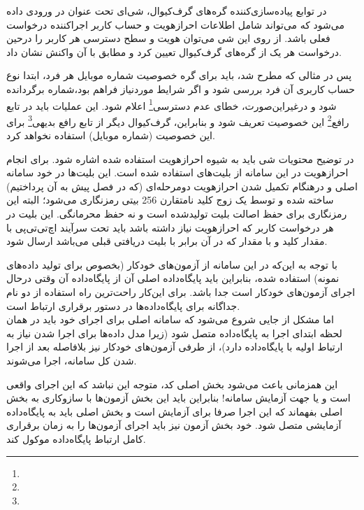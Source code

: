 در توابع پیاده‌سازی‌کننده گره‌های گرف‌کیوال، شی‌ای تحت عنوان  در ورودی داده می‌شود که می‌تواند شامل اطلاعات احرازهویت و حساب کاربر اجراکننده درخواست فعلی باشد. از روی این شی می‌توان هویت و سطح دسترسی هر کاربر را درحین درخواست هر یک از گره‌های گرف‌کیوال تعیین کرد و مطابق با آن واکنش نشان داد.

پس در مثالی که مطرح شد، باید برای گره خصوصیت شماره موبایل هر فرد، ابتدا نوع حساب کاربری آن فرد بررسی شود و اگر شرایط موردنیاز فراهم بود،‌شماره برگردانده شود و درغیراین‌صورت،‌ خطای عدم دسترسی\footnote{} اعلام شود. این عملیات باید در تابع رافع\footnote{} این خصوصیت تعریف شود و بنابراین، گرف‌کیوال دیگر از تابع رافع بدیهی\footnote{} برای این خصوصیت (شماره موبایل) استفاده نخواهد کرد.

در توضیح محتویات شی  باید به شیوه احرازهویت استفاده شده اشاره شود. برای انجام احرازهویت در این سامانه از بلیت‌های  استفاده شده است. این بلیت‌ها در خود سامانه اصلی و درهنگام تکمیل شدن احرازهویت دومرحله‌ای (که در فصل پیش به آن پرداختیم) ساخته شده و توسط یک زوج کلید نامتقارن 256 بیتی رمزنگاری می‌شود؛ البته این رمزنگاری برای حفظ اصالت بلیت تولیدشده است و نه حفظ محرمانگی. این بلیت در هر درخواست کاربر که احرازهویت نیاز داشته باشد باید تحت سرآیند اچ‌تی‌تی‌پی با مقدار کلید  و با مقدار  که در آن  برابر با بلیت دریافتی قبلی می‌باشد ارسال شود\cite{jwt}. 


با توجه به این‌که در این سامانه از آزمون‌های خودکار (بخصوص برای تولید داده‌های نمونه) استفاده شده، بنابراین باید پایگاه‌داده اصلی آن از پایگاه‌داده آن وقتی درحال اجرای آزمون‌های خودکار است جدا باشد. برای این‌کار راحت‌ترین راه استفاده از دو نام جداگانه برای پایگاه‌داده‌ها در دستور برقراری ارتباط است.\\

اما مشکل از جایی شروع می‌شود که سامانه اصلی برای اجرای خود باید در همان لحظه ابتدای اجرا به پایگاه‌داده متصل شود (زیرا مدل داده‌ها برای اجرا شدن نیاز به ارتباط اولیه با پایگاه‌داده دارد)، از طرفی آزمون‌های خودکار نیز بلافاصله بعد از اجرا شدن کل سامانه، اجرا می‌شوند.

این همزمانی باعث می‌شود بخش اصلی کد، متوجه این نباشد که این اجرای واقعی است و یا جهت آزمایش سامانه! بنابراین باید این بخش آزمون‌ها با سازوکاری به بخش اصلی بفهماند که این اجرا صرفا برای آزمایش است و بخش اصلی باید به پایگاه‌داده آزمایشی متصل شود. خود بخش آزمون نیز باید اجرای آزمون‌ها را به زمان برقراری کامل ارتباط پایگاه‌داده موکول کند.\\

